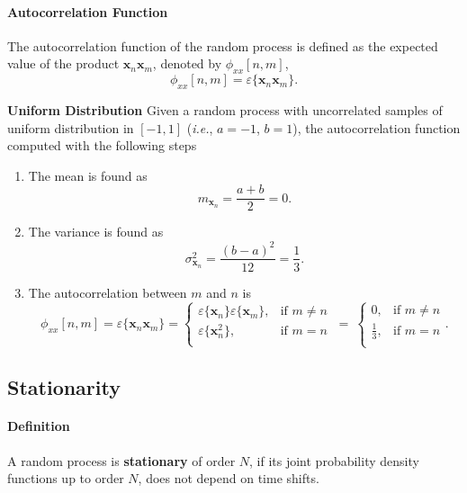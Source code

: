 \paragraph{Autocorrelation Function} The autocorrelation function of the random process is defined as the expected value of the product $\mathbf{x}_n \mathbf{x}_m$, denoted by $\phi_{xx}[n,m]$,
\[
    \phi_{xx}[n,m] = \varepsilon\{ \mathbf{x}_n \mathbf{x}_m \}.
\]
\begin{ex}{\textbf{Uniform Distribution}}
    Given a random process with uncorrelated samples of uniform distribution in $[−1,1]$ (\textit{i.e.}, $a=-1$, $b=1$), the autocorrelation function computed with the following steps
    \begin{enumerate}
        \item The mean is found as
        \[
            m_{\mathbf{x}_n} = \frac{a+b}{2} = 0.
        \]

        \item The variance is found as
        \[
            \sigma_{\mathbf{x}_n}^2 = \frac{(b-a)^2}{12} = \frac{1}{3}.
        \]

        \item The autocorrelation between $m$ and $n$ is
        \[
            \phi_{xx}[n,m] 
            = \varepsilon\{ \mathbf{x}_n \mathbf{x}_m \} 
            = 
            \begin{cases}
                \varepsilon\{\mathbf{x}_n\}\varepsilon\{\mathbf{x}_m\}, & \text{if } m \neq n \\
                \varepsilon\{\mathbf{x}_n^2\}, & \text{if } m = n \\
            \end{cases}
            \ = \
            \begin{cases}
                0, & \text{if } m \neq n \\
               \frac{1}{3}, & \text{if } m = n \\
            \end{cases}.
        \]
    \end{enumerate}
\end{ex}

\subsection{Stationarity}
\paragraph{Definition}  A random process is \textbf{stationary} of order $N$, if its joint probability density functions up to order $N$, does not depend on time shifts.\\

